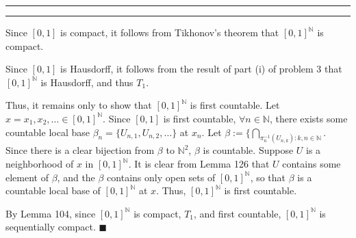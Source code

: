 \documentclass[11pt]{article}
\newcounter{questionCounter}
\newcounter{partCounter}[questionCounter]
\newenvironment{question}[2][\arabic{questionCounter}]{%
    \setcounter{partCounter}{0}%
    \vspace{.25in} \hrule \vspace{0.5em}%
        \noindent{\bf #2}%
    \vspace{0.8em} \hrule \vspace{.10in}%
    \addtocounter{questionCounter}{1}%
}{}
\renewcommand{\qed}{\quad $\blacksquare$}
\newcommand{\inv}{^{-1}}
\newcommand{\N}{\mathbb{N}} %
\begin{document}
\begin{question}{Problem 6}
Since $[0,1]$ is compact, it follows from Tikhonov's theorem that $[0,1]^{\N}$
is compact.

Since $[0,1]$ is Hausdorff, it follows from the result of part (i) of problem
3 that $[0,1]^{\N}$ is Hausdorff, and thus $T_1$.

Thus, it remains only to show that $[0,1]^{\N}$ is first countable. Let
$x = x_1,x_2,\ldots \in [0,1]^{\N}$. Since $[0,1]$ is first countable,
$\forall n \in \N$, there exists some countable local base
$\beta_n = \{U_{n,1},U_{n,2},\ldots\}$ at $x_n$.
Let $\beta := \{\bigcap_{\pi_{n}\inv(U_{n,k}) : k,n \in \N}$. Since there is
a clear bijection from $\beta$ to $\N^2$, $\beta$ is countable. Suppose $U$ is
a neighborhood of $x$ in $[0,1]^{\N}$. It is clear from Lemma 126 that $U$
contains some element of $\beta$, and the $\beta$ contains only open sets of
$[0,1]^{\N}$, so that $\beta$ is a countable local base of $[0,1]^{\N}$ at
$x$. Thus, $[0,1]^{\N}$ is first countable.

By Lemma 104, since $[0,1]^{\N}$ is compact, $T_1$, and first countable,
$[0,1]^{\N}$ is sequentially compact. \qed
\end{question}
\end{document}
